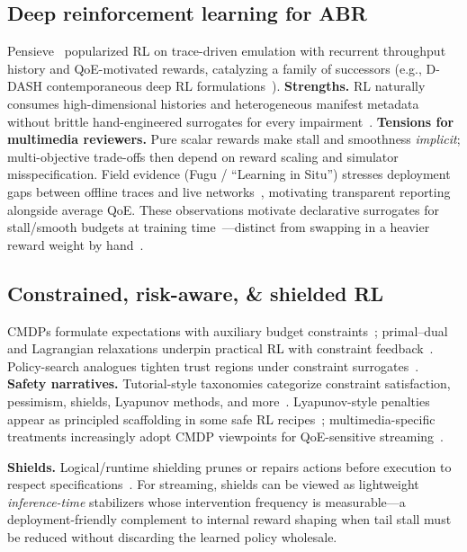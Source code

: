 \documentclass[preprint,12pt]{elsarticle}
\begin{document}
\subsection{Deep reinforcement learning for ABR}

Pensieve~\cite{mao2017neural} popularized RL on trace-driven emulation with recurrent throughput history and QoE-motivated rewards, catalyzing a family of successors (e.g., D-DASH contemporaneous deep RL formulations~\cite{gadaleta2017ddash}).
\textbf{Strengths.}
RL naturally consumes high-dimensional histories and heterogeneous manifest metadata without brittle hand-engineered surrogates for every impairment~\cite{sutton2018reinforcement}.
\textbf{Tensions for multimedia reviewers.}
Pure scalar rewards make stall and smoothness \emph{implicit}; multi-objective trade-offs then depend on reward scaling and simulator misspecification.
Field evidence (Fugu / ``Learning in Situ'') stresses deployment gaps between offline traces and live networks~\cite{yan2019learning}, motivating transparent reporting alongside average QoE.
These observations motivate declarative surrogates for stall/smooth budgets at training time~\cite{xiao2025qoe}---distinct from swapping in a heavier reward weight by hand~\cite{bentaleb2018survey}.

\subsection{Constrained, risk-aware, \& shielded RL}

CMDPs formulate expectations with auxiliary budget constraints~\cite{altman1999constrained}; primal--dual and Lagrangian relaxations underpin practical RL with constraint feedback~\cite{paternain2019dual}.
Policy-search analogues tighten trust regions under constraint surrogates~\cite{achiam2017constrained}.
\textbf{Safety narratives.}
Tutorial-style taxonomies categorize constraint satisfaction, pessimism, shields, Lyapunov methods, and more~\cite{tian2022towards}.
Lyapunov-style penalties appear as principled scaffolding in some safe RL recipes~\cite{chow2018lyapunov}; multimedia-specific treatments increasingly adopt CMDP viewpoints for QoE-sensitive streaming~\cite{xiao2025qoe}.

\textbf{Shields.}
Logical/runtime shielding prunes or repairs actions before execution to respect specifications~\cite{alshiekh2018shielding}.
For streaming, shields can be viewed as lightweight \emph{inference-time} stabilizers whose intervention frequency is measurable---a deployment-friendly complement to internal reward shaping when tail stall must be reduced without discarding the learned policy wholesale.
\end{document}
